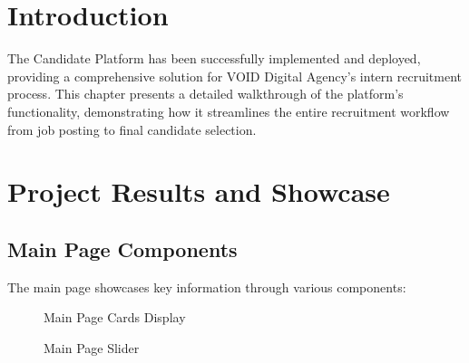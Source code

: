 
\section{Introduction}
\noindent
The Candidate Platform has been successfully implemented and deployed, providing a comprehensive solution for VOID Digital Agency's intern recruitment process. This chapter presents a detailed walkthrough of the platform's functionality, demonstrating how it streamlines the entire recruitment workflow from job posting to final candidate selection.

\section{Project Results and Showcase}



\subsection{Main Page Components}
\noindent
The main page showcases key information through various components:

\begin{figure}[H]
    \centering
    \caption{Main Page Cards Display}
    \label{fig:main_cards}
\end{figure}

\begin{figure}[H]
    \centering
    \caption{Main Page Slider}
    \label{fig:main_slider}
\end{figure}

